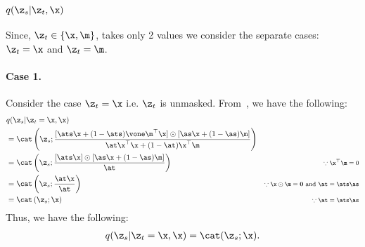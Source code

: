 \documentclass{article} %
\begin{document}
{\begin{appendices}
\subsubsection{\texorpdfstring{$q(\z_s | \z_t, \x)$}{Lg}}
Since, $\z_t \in \{\x, \m\}$, takes only 2 values we consider the separate cases: $\z_t = \x$ and $\z_t=\m$.

\paragraph{Case 1.} Consider the case \textbf{$\z_t = \x$} i.e. $\z_t$ is unmasked. 
From~, we have the following:
\begin{align}
    & q(\z_s | \z_t=\x, \x) \nonumber \\
    & = \cat \left(
        \z_s; \frac{[\ats \x + (1 - \ats)\vone \m^\top \x]  \odot [\as \x + (1 - \as) \m]}{
             \at \x^\top \x  + (1 - \at)\x^\top\m} \right) & \nonumber \\
    & = \cat \left(
        \z_s; \frac{[\ats \x ]  \odot [\as \x + (1 - \as) \m]}{
             \at} \right) & \text{\footnotesize $\because \x^\top\m = 0$} \nonumber \\
    & = \cat \left(
        \z_s; \frac{\at \x}{\at} \right) & \text{\footnotesize $\because \x\odot\m = \mathbf{0}$ and $\at = \ats \as$} \nonumber \\
    & = \cat \left(\z_s; \x \right) & \text{\footnotesize $\because \at = \ats \as$}
\end{align}
Thus, we have the following:
\begin{align}
    q(\z_s | \z_t=\x, \x) = \cat (\z_s; \x).
\end{align}


\end{appendices}}
\end{document}
